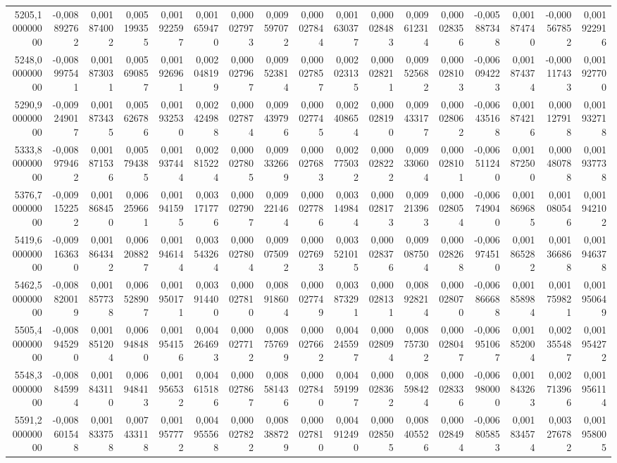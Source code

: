 \begin{longtable}{rrrrrrrrrrrrrrrrr}
5205,100000000 & -0,008892762 & 0,001874002 & 0,005199355 & 0,001922597 & 0,001659470 & 0,000027973 & 0,009597072 & 0,000027844 & 0,001630377 & 0,000028483 & 0,009612314 & 0,000028356 & -0,005887348 & 0,001874740 & -0,000567852 & 0,001922916\\
5248,000000000 & -0,008997541 & 0,001873031 & 0,005690857 & 0,001926961 & 0,002048199 & 0,000027967 & 0,009523814 & 0,000027857 & 0,002023135 & 0,000028211 & 0,009525682 & 0,000028103 & -0,006094223 & 0,001874374 & -0,000117433 & 0,001927700\\
5290,900000000 & -0,009249017 & 0,001873435 & 0,005626786 & 0,001932530 & 0,002424988 & 0,000027874 & 0,009439796 & 0,000027745 & 0,002408654 & 0,000028190 & 0,009433177 & 0,000028062 & -0,006435168 & 0,001874216 & 0,000127918 & 0,001932718\\
5333,800000000 & -0,008979462 & 0,001871536 & 0,005794385 & 0,001937444 & 0,002815224 & 0,000027805 & 0,009332669 & 0,000027683 & 0,002775032 & 0,000028222 & 0,009330604 & 0,000028101 & -0,006511240 & 0,001872500 & 0,000480788 & 0,001937738\\
5376,700000000 & -0,009152252 & 0,001868450 & 0,006259661 & 0,001941595 & 0,003171776 & 0,000027907 & 0,009221464 & 0,000027786 & 0,003149844 & 0,000028173 & 0,009213963 & 0,000028054 & -0,006749040 & 0,001869685 & 0,001080546 & 0,001942102\\
5419,600000000 & -0,009163630 & 0,001864342 & 0,006208827 & 0,001946144 & 0,003543264 & 0,000027804 & 0,009075092 & 0,000027693 & 0,003521015 & 0,000028376 & 0,009087504 & 0,000028268 & -0,006974510 & 0,001865282 & 0,001366868 & 0,001946378\\
5462,500000000 & -0,008820019 & 0,001857738 & 0,006528907 & 0,001950171 & 0,003914400 & 0,000027810 & 0,008918604 & 0,000027749 & 0,003873291 & 0,000028131 & 0,008928214 & 0,000028070 & -0,006866688 & 0,001858984 & 0,001759821 & 0,001950649\\
5505,400000000 & -0,008945290 & 0,001851204 & 0,006948480 & 0,001954156 & 0,004264693 & 0,000027712 & 0,008757699 & 0,000027662 & 0,004245597 & 0,000028094 & 0,008757302 & 0,000028047 & -0,006951067 & 0,001852004 & 0,002355487 & 0,001954272\\
5548,300000000 & -0,008845994 & 0,001843110 & 0,006948413 & 0,001956532 & 0,004615186 & 0,000027867 & 0,008581436 & 0,000027840 & 0,004591997 & 0,000028362 & 0,008598424 & 0,000028336 & -0,006980000 & 0,001843263 & 0,002713966 & 0,001956114\\
5591,200000000 & -0,008601548 & 0,001833758 & 0,007433118 & 0,001957772 & 0,004955568 & 0,000027822 & 0,008388729 & 0,000027810 & 0,004912490 & 0,000028505 & 0,008405526 & 0,000028494 & -0,006805853 & 0,001834574 & 0,003276782 & 0,001958005\\

\end{longtable}
